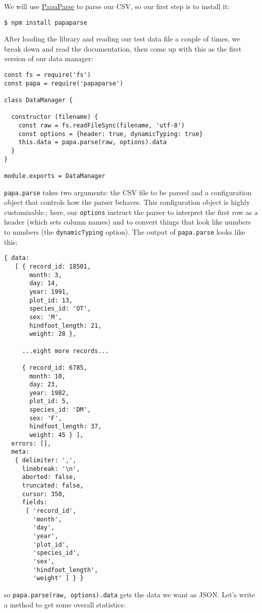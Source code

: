 We will use \href{https://www.papaparse.com/}{PapaParse} to parse our CSV,
so our first step is to install it:

\begin{verbatim}
$ npm install papaparse
\end{verbatim}

After loading the library and reading our test data file a couple of times,
we break down and read the documentation,
then come up with this as the first version of our data manager:

\begin{verbatim}
const fs = require('fs')
const papa = require('papaparse')

class DataManager {

  constructor (filename) {
    const raw = fs.readFileSync(filename, 'utf-8')
    const options = {header: true, dynamicTyping: true}
    this.data = papa.parse(raw, options).data
  }
}

module.exports = DataManager
\end{verbatim}

\texttt{papa.parse} takes two arguments: 
the CSV file to be parsed
and a configuration object that controls how the parser behaves. 
This configuration object is highly customizable.;
here,
our \texttt{options}  instruct the parser 
to interpret the first row as a header (which sets column names)
and to convert things that look like numbers to numbers (the \texttt{dynamicTyping} option).
The output of \texttt{papa.parse} looks like this:

\begin{verbatim}
{ data:
   [ { record_id: 18501,
       month: 3,
       day: 14,
       year: 1991,
       plot_id: 13,
       species_id: 'OT',
       sex: 'M',
       hindfoot_length: 21,
       weight: 28 },

     ...eight more records...

     { record_id: 6785,
       month: 10,
       day: 23,
       year: 1982,
       plot_id: 5,
       species_id: 'DM',
       sex: 'F',
       hindfoot_length: 37,
       weight: 45 } ],
  errors: [],
  meta:
   { delimiter: ',',
     linebreak: '\n',
     aborted: false,
     truncated: false,
     cursor: 350,
     fields:
      [ 'record_id',
        'month',
        'day',
        'year',
        'plot_id',
        'species_id',
        'sex',
        'hindfoot_length',
        'weight' ] } }
\end{verbatim}

\noindent
so \texttt{papa.parse(raw, options).data} gets the data we want as JSON.
Let's write a method to get some overall statistics:

